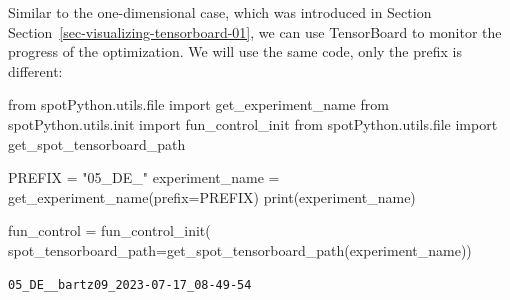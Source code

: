 \documentclass[
  letterpaper,
  DIV=11,
  numbers=noendperiod]{scrreprt}
\newenvironment{Shaded}{\begin{snugshade}}{\end{snugshade}}
\newcommand{\BuiltInTok}[1]{\textcolor[rgb]{0.00,0.23,0.31}{#1}}
\newcommand{\ImportTok}[1]{\textcolor[rgb]{0.00,0.46,0.62}{#1}}
\newcommand{\NormalTok}[1]{\textcolor[rgb]{0.00,0.23,0.31}{#1}}
\newcommand{\OperatorTok}[1]{\textcolor[rgb]{0.37,0.37,0.37}{#1}}
\newcommand{\StringTok}[1]{\textcolor[rgb]{0.13,0.47,0.30}{#1}}
\begin{document}
\begin{tcolorbox}[enhanced jigsaw, left=2mm, title=\textcolor{quarto-callout-note-color}{\faInfo}\hspace{0.5em}{TensorBoard}, bottomrule=.15mm, titlerule=0mm, breakable, rightrule=.15mm, toprule=.15mm, coltitle=black, colbacktitle=quarto-callout-note-color!10!white, leftrule=.75mm, arc=.35mm, colframe=quarto-callout-note-color-frame, bottomtitle=1mm, colback=white, opacitybacktitle=0.6, toptitle=1mm, opacityback=0]

Similar to the one-dimensional case, which was introduced in Section
Section~\ref{sec-visualizing-tensorboard-01}, we can use TensorBoard to
monitor the progress of the optimization. We will use the same code,
only the prefix is different:

\begin{Shaded}
\begin{Highlighting}[]
\ImportTok{from}\NormalTok{ spotPython.utils.}\BuiltInTok{file} \ImportTok{import}\NormalTok{ get\_experiment\_name}
\ImportTok{from}\NormalTok{ spotPython.utils.init }\ImportTok{import}\NormalTok{ fun\_control\_init}
\ImportTok{from}\NormalTok{ spotPython.utils.}\BuiltInTok{file} \ImportTok{import}\NormalTok{ get\_spot\_tensorboard\_path}

\NormalTok{PREFIX }\OperatorTok{=} \StringTok{"05\_DE\_"}
\NormalTok{experiment\_name }\OperatorTok{=}\NormalTok{ get\_experiment\_name(prefix}\OperatorTok{=}\NormalTok{PREFIX)}
\BuiltInTok{print}\NormalTok{(experiment\_name)}

\NormalTok{fun\_control }\OperatorTok{=}\NormalTok{ fun\_control\_init(}
\NormalTok{    spot\_tensorboard\_path}\OperatorTok{=}\NormalTok{get\_spot\_tensorboard\_path(experiment\_name))}
\end{Highlighting}
\end{Shaded}

\begin{verbatim}
05_DE__bartz09_2023-07-17_08-49-54
\end{verbatim}

\end{tcolorbox}
\end{document}
